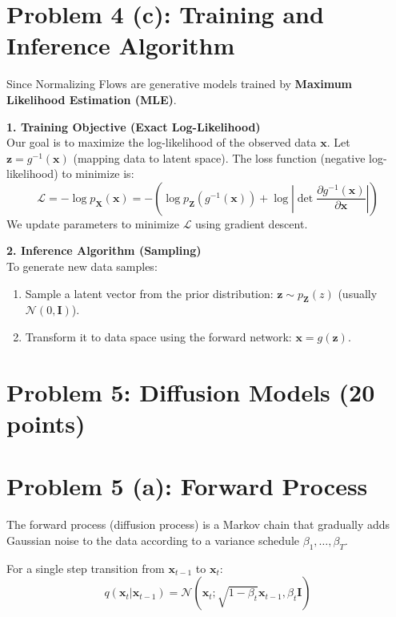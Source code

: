 \documentclass[12pt]{article}
\begin{document}
\section*{Problem 4 (c): Training and Inference Algorithm}

Since Normalizing Flows are generative models trained by \textbf{Maximum Likelihood Estimation (MLE)}.

\textbf{1. Training Objective (Exact Log-Likelihood)} \\
Our goal is to maximize the log-likelihood of the observed data $\mathbf{x}$.
Let $\mathbf{z} = g^{-1}(\mathbf{x})$ (mapping data to latent space). The loss function (negative log-likelihood) to minimize is:
\[
    \mathcal{L} = - \log p_{\mathbf{X}}(\mathbf{x}) = - \left( \log p_{\mathbf{Z}}(g^{-1}(\mathbf{x})) + \log \left| \det \frac{\partial g^{-1}(\mathbf{x})}{\partial \mathbf{x}} \right| \right)
\]
We update parameters to minimize $\mathcal{L}$ using gradient descent.

\textbf{2. Inference Algorithm (Sampling)} \\
To generate new data samples:
\begin{enumerate}
    \item Sample a latent vector from the prior distribution: $\mathbf{z} \sim p_{\mathbf{Z}}(z)$ (usually $\mathcal{N}(0, \mathbf{I})$).
    \item Transform it to data space using the forward network: $\mathbf{x} = g(\mathbf{z})$.
\end{enumerate}



\section*{Problem 5: Diffusion Models (20 points)}

\section*{Problem 5 (a): Forward Process}

The forward process (diffusion process) is a Markov chain that gradually adds Gaussian noise to the data according to a variance schedule $\beta_1, \dots, \beta_T$.

For a single step transition from $\mathbf{x}_{t-1}$ to $\mathbf{x}_t$:
\[
    q(\mathbf{x}_t | \mathbf{x}_{t-1}) = \mathcal{N}(\mathbf{x}_t; \sqrt{1 - \beta_t}\mathbf{x}_{t-1}, \beta_t \mathbf{I})
\]
\end{document}
